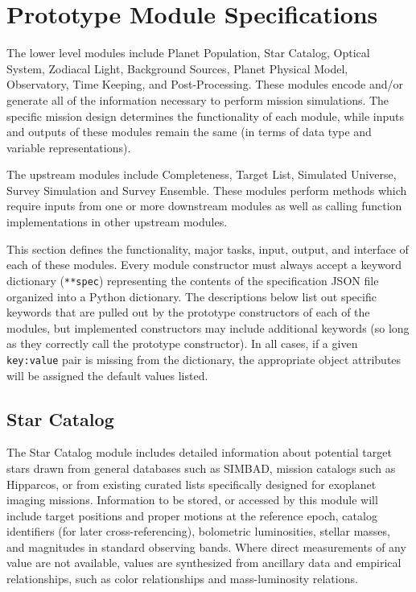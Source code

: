 \documentclass[cleanfoot]{asme2ej}
\begin{document}
\section{Prototype Module Specifications}\label{sec:modules}
The lower level modules include Planet Population, Star Catalog, Optical System, Zodiacal Light, Background Sources, Planet Physical Model, Observatory, Time Keeping, and Post-Processing.  These modules encode and/or generate all of the information necessary to perform mission simulations.  The specific mission design determines the functionality of each module, while inputs and outputs of these modules remain the same (in terms of data type and variable representations).  

The upstream modules include Completeness, Target List, Simulated Universe, Survey Simulation and Survey Ensemble. These modules perform methods which require inputs from one or more downstream modules as well as calling function implementations in other upstream modules. 

This section defines the functionality, major tasks, input, output, and interface of each of these modules. Every module constructor must always accept a keyword dictionary (\verb+**spec+) representing the contents of the specification JSON file organized into a Python dictionary. The descriptions below list out specific keywords that are pulled out by the prototype constructors of each of the modules, but implemented constructors may include additional keywords (so long as they correctly call the prototype constructor).  In all cases, if a given \verb+key:value+ pair is missing from the dictionary, the appropriate object attributes will be assigned the default values listed.


\subsection{Star Catalog} \label{sec:starcatalog}
The Star Catalog module includes detailed information about potential target stars drawn from general databases such as SIMBAD, mission catalogs such as Hipparcos, or from existing curated lists specifically designed for exoplanet imaging missions.  Information to be stored, or accessed by this module will include target positions and proper motions at the reference epoch, catalog identifiers (for later cross-referencing), bolometric luminosities, stellar masses, and magnitudes in standard observing bands.  Where direct measurements of any value are not available, values are synthesized from ancillary data and empirical relationships, such as color relationships and mass-luminosity relations.
\end{document}
